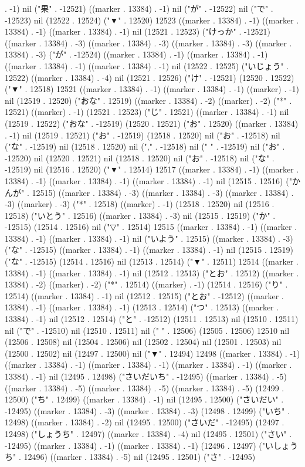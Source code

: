 . -1) nil ("果" . -12521) ((marker . 13384) . -1) nil ("が" . -12522) nil ("で" . -12523) nil (12522 . 12524) ("▼" . 12520) 12523 ((marker . 13384) . -1) ((marker . 13384) . -1) ((marker . 13384) . -1) nil (12521 . 12523) ("けっか" . -12521) ((marker . 13384) . -3) ((marker . 13384) . -3) ((marker . 13384) . -3) ((marker . 13384) . -3) ("が" . -12524) ((marker . 13384) . -1) ((marker . 13384) . -1) ((marker . 13384) . -1) ((marker . 13384) . -1) nil (12522 . 12525) ("いじょう" . 12522) ((marker . 13384) . -4) nil (12521 . 12526) ("け" . -12521) (12520 . 12522) ("▼" . 12518) 12521 ((marker . 13384) . -1) ((marker . 13384) . -1) ((marker) . -1) nil (12519 . 12520) ("おな" . 12519) ((marker . 13384) . -2) ((marker) . -2) ("*" . 12521) ((marker) . -1) (12521 . 12523) ("じ" . 12521) ((marker . 13384) . -1) nil (12519 . 12522) ("おな" . -12519) (12520 . 12521) ("お" . 12520) ((marker . 13384) . -1) nil (12519 . 12521) ("お" . -12519) (12518 . 12520) nil ("お" . -12518) nil ("な" . -12519) nil (12518 . 12520) nil ("," . -12518) nil (" " . -12519) nil ("お" . -12520) nil (12520 . 12521) nil (12518 . 12520) nil ("お" . -12518) nil ("な" . -12519) nil (12516 . 12520) ("▼" . 12514) 12517 ((marker . 13384) . -1) ((marker . 13384) . -1) ((marker . 13384) . -1) ((marker . 13384) . -1) nil (12515 . 12516) ("かんが" . 12515) ((marker . 13384) . -3) ((marker . 13384) . -3) ((marker . 13384) . -3) ((marker) . -3) ("*" . 12518) ((marker) . -1) (12518 . 12520) nil (12516 . 12518) ("いとう" . 12516) ((marker . 13384) . -3) nil (12515 . 12519) ("か" . -12515) (12514 . 12516) nil ("▽" . 12514) 12515 ((marker . 13384) . -1) ((marker . 13384) . -1) ((marker . 13384) . -1) nil ("いよう" . 12515) ((marker . 13384) . -3) ("な" . -12515) ((marker . 13384) . -1) ((marker . 13384) . -1) nil (12515 . 12519) ("な" . -12515) (12514 . 12516) nil (12513 . 12514) ("▼" . 12511) 12514 ((marker . 13384) . -1) ((marker . 13384) . -1) nil (12512 . 12513) ("とお" . 12512) ((marker . 13384) . -2) ((marker) . -2) ("*" . 12514) ((marker) . -1) (12514 . 12516) ("り" . 12514) ((marker . 13384) . -1) nil (12512 . 12515) ("とお" . -12512) ((marker . 13384) . -1) ((marker . 13384) . -1) (12513 . 12514) ("つ" . 12513) ((marker . 13384) . -1) nil (12512 . 12514) ("と" . -12512) (12511 . 12513) nil (12510 . 12511) nil ("で" . -12510) nil (12510 . 12511) nil (" " . 12506) (12505 . 12506) 12510 nil (12506 . 12508) nil (12504 . 12506) nil (12502 . 12504) nil (12501 . 12503) nil (12500 . 12502) nil (12497 . 12500) nil ("▼" . 12494) 12498 ((marker . 13384) . -1) ((marker . 13384) . -1) ((marker . 13384) . -1) ((marker . 13384) . -1) ((marker . 13384) . -1) nil (12495 . 12498) ("さいだいち" . -12495) ((marker . 13384) . -5) ((marker . 13384) . -5) ((marker . 13384) . -5) ((marker . 13384) . -5) (12499 . 12500) ("ち" . 12499) ((marker . 13384) . -1) nil (12495 . 12500) ("さいだい" . -12495) ((marker . 13384) . -3) ((marker . 13384) . -3) (12498 . 12499) ("いち" . 12498) ((marker . 13384) . -2) nil (12495 . 12500) ("さいだ" . -12495) (12497 . 12498) ("しょうち" . 12497) ((marker . 13384) . -4) nil (12495 . 12501) ("さい" . -12495) ((marker . 13384) . -1) ((marker . 13384) . -1) (12496 . 12497) ("いしょうち" . 12496) ((marker . 13384) . -5) nil (12495 . 12501) ("さ" . -12495) 